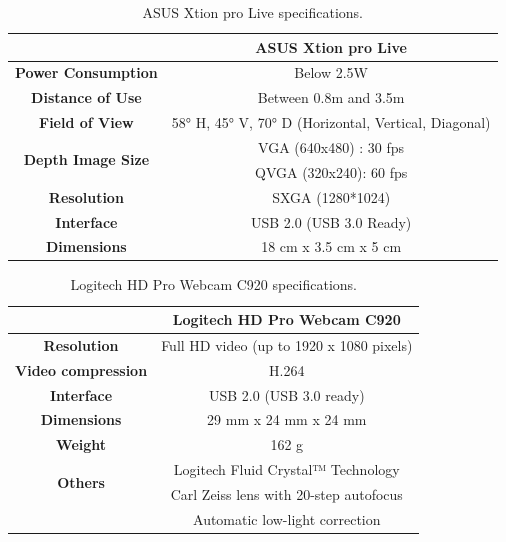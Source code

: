 \begin{table}[h]
\begin{center}
\begin{tabular}{|c|c|}
\hline
& \bf{ASUS Xtion pro Live} \\
\hline \bf{ Power Consumption } & Below 2.5W \\
\hline \bf{ Distance of Use } & Between 0.8m and 3.5m \\
\hline \bf{ Field of View } & 58° H, 45° V, 70° D (Horizontal, Vertical, Diagonal) \\
\hline \multirow{2}{*}{\bf{ Depth Image Size }} 
& VGA (640x480) : 30 fps\\
& QVGA (320x240): 60 fps \\
\hline \bf{ Resolution } & SXGA (1280*1024)  \\
\hline \bf{ Interface } & USB 2.0 (USB 3.0 Ready) \\
\hline \bf{ Dimensions } & 18 cm x 3.5 cm x 5 cm \\
\hline
\end{tabular}
\end{center}
\caption{ASUS Xtion pro Live specifications.}
\end{table}

\begin{table}[h]
\begin{center}
\begin{tabular}{|c|c|}
\hline
& \bf{Logitech HD Pro Webcam C920} \\
\hline \bf{Resolution } & Full HD video (up to 1920 x 1080 pixels) \\
\hline \bf{Video compression } & H.264 \\ 
\hline \bf{Interface } & USB 2.0 (USB 3.0 ready) \\
\hline \bf{Dimensions } & 29 mm x 24 mm x 24 mm \\ 
\hline \bf{Weight } & 162 g \\
\hline \multirow{2}{*}{\bf{Others}}
& Logitech Fluid Crystal™ Technology \\
& Carl Zeiss lens with 20-step autofocus \\
& Automatic low-light correction \\
\hline
\end{tabular}
\end{center}
\caption{Logitech HD Pro Webcam C920 specifications.}
\end{table}


